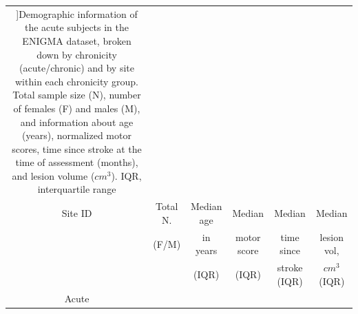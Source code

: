 \documentclass[phd,tocprelim]{cornell}
\renewcommand{\caption}[1]{\singlespacing\hangcaption{#1}\normalspacing}
\begin{document}
\singlespacing
\begin{longtable}{c|c|c|c|c|c}
\caption[]{Demographic information of the acute subjects in the ENIGMA dataset, broken down by chronicity (acute/chronic) and by site within each chronicity group. Total sample size (N), number of females (F) and males (M), and information about age (years), normalized motor scores, time since stroke at the time of assessment (months), and lesion volume ($cm^3$). IQR, interquartile range\label{long}}\\

Site ID & Total N.  & Median age & Median   & Median   & Median  \\
& (F/M) & in years & motor score&  time since  & lesion vol,  \\
& &(IQR)  &  (IQR) & stroke (IQR)  & $cm^3$ (IQR)  \\
Acute & & & & & \\


\end{longtable}
\end{document}
